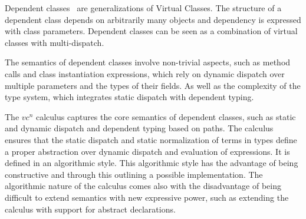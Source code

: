 Dependent classes~\cite{dc,vaidas:thesis} are generalizations of Virtual Classes.
The structure of a dependent class depends on arbitrarily many objects and
dependency is expressed with class parameters.
Dependent classes can be seen as a combination of virtual classes with multi-dispatch.

The semantics of dependent classes involve non-trivial aspects,
such as method calls and class instantiation expressions,
which rely on dynamic dispatch over multiple parameters and the types of their fields.
As well as the complexity of the type system,
which integrates static dispatch with dependent typing.

The $vc^n$ calculus captures the core semantics of dependent classes,
such as static and dynamic dispatch and dependent typing based on paths.
The calculus ensures that the static dispatch and static normalization of terms in types
define a proper abstraction over dynamic dispatch and evaluation of expressions.
It is defined in an algorithmic style.
This algorithmic style has the advantage of being constructive
and through this outlining a possible implementation.
The algorithmic nature of the calculus comes also with the disadvantage
of being difficult to extend semantics with new expressive power,
such as extending the calculus with support for abstract declarations.



